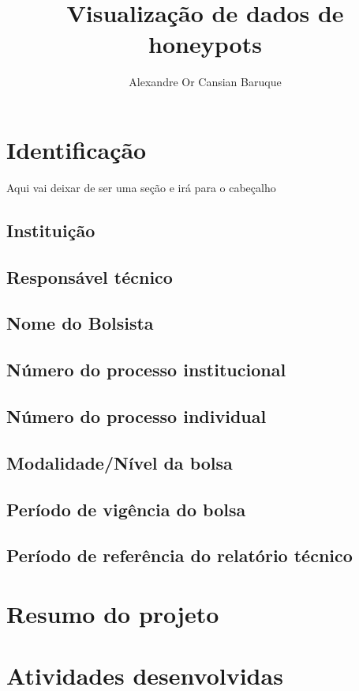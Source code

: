 \documentclass{article}
\title{ Visualização de dados de honeypots }
\author{ Alexandre Or Cansian Baruque \textsc{}  }
\begin{document}
\date{}
\maketitle
\setlength\parindent{0pt}
\renewcommand{\labelenumi}{\alph{enumi}.}

\section{Identificação}
Aqui vai deixar de ser uma seção e irá para o cabeçalho
\subsection{Instituição}
\subsection{Responsável técnico}
\subsection{Nome do Bolsista}
\subsection{Número do processo institucional}
\subsection{Número do processo individual}
\subsection{Modalidade/Nível da bolsa}
\subsection{Período de vigência do bolsa}
\subsection{Período de referência do relatório técnico}

\section{Resumo do projeto}

\section{Atividades desenvolvidas}
\end{document}

